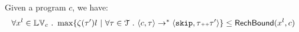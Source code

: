 {
  \begin{thm}
    \label{thm:reachability_soundness}
  Given a program ${c}$, we have:
  \[
  \forall x^l \in \lvar_c \st 
  \max \left\{ \vcounter(\vtrace') l ~ \middle\vert~
  \forall \vtrace \in \mathcal{T} \st \config{{c}, \trace} \to^{*} \config{\eskip, \trace\tracecat\vtrace'} \right\} 
  \leq 
  \rb(x^l, c)
  \]
  \end{thm}
}